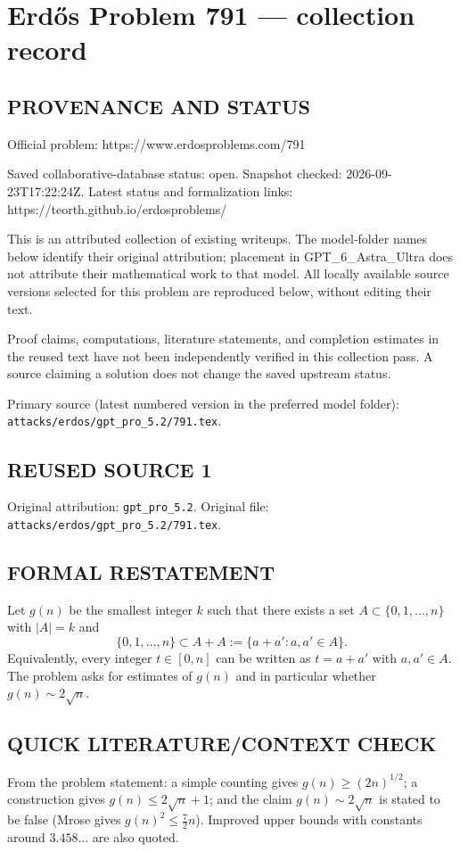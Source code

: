 \section*{Erd\H{o}s Problem 791 --- collection record}

\subsection*{PROVENANCE AND STATUS}
Official problem: https://www.erdosproblems.com/791

Saved collaborative-database status: open.
Snapshot checked: 2026-09-23T17:22:24Z.
Latest status and formalization links: https://teorth.github.io/erdosproblems/

This is an attributed collection of existing writeups. The model-folder names below identify their original attribution; placement in GPT\_6\_Astra\_Ultra does not attribute their mathematical work to that model. All locally available source versions selected for this problem are reproduced below, without editing their text.

Proof claims, computations, literature statements, and completion estimates in the reused text have not been independently verified in this collection pass. A source claiming a solution does not change the saved upstream status.

Primary source (latest numbered version in the preferred model folder): \texttt{attacks/erdos/gpt\_pro\_5.2/791.tex}.

\subsection*{REUSED SOURCE 1}
Original attribution: \texttt{gpt\_pro\_5.2}.
Original file: \texttt{attacks/erdos/gpt\_pro\_5.2/791.tex}.


\subsection*{FORMAL RESTATEMENT}
Let $g(n)$ be the smallest integer $k$ such that there exists a set
$A\subset\{0,1,\dots,n\}$ with $|A|=k$ and
\[
\{0,1,\dots,n\} \subset A+A := \{a+a': a,a'\in A\}.
\]
Equivalently, every integer $t\in[0,n]$ can be written as $t=a+a'$ with $a,a'\in A$.
The problem asks for estimates of $g(n)$ and in particular whether $g(n)\sim 2\sqrt n$.

\subsection*{QUICK LITERATURE/CONTEXT CHECK}
From the problem statement: a simple counting gives $g(n)\ge (2n)^{1/2}$; a construction gives $g(n)\le 2\sqrt n+1$; and the claim $g(n)\sim 2\sqrt n$ is stated to be false (Mrose gives $g(n)^2\le \tfrac72 n$). Improved upper bounds with constants around $3.458\ldots$ are also quoted.

